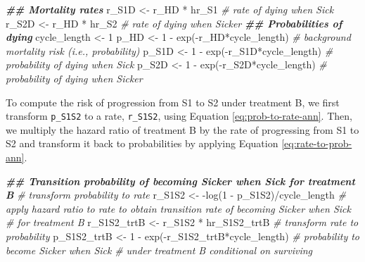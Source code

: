 \documentclass[
]{article}
\newenvironment{Shaded}{\begin{snugshade}}{\end{snugshade}}
\newcommand{\CommentTok}[1]{\textcolor[rgb]{0.56,0.35,0.01}{\textit{#1}}}
\newcommand{\DecValTok}[1]{\textcolor[rgb]{0.00,0.00,0.81}{#1}}
\newcommand{\DocumentationTok}[1]{\textcolor[rgb]{0.56,0.35,0.01}{\textbf{\textit{#1}}}}
\newcommand{\FunctionTok}[1]{\textcolor[rgb]{0.00,0.00,0.00}{#1}}
\newcommand{\NormalTok}[1]{#1}
\newcommand{\OtherTok}[1]{\textcolor[rgb]{0.56,0.35,0.01}{#1}}
\newcommand{\SpecialCharTok}[1]{\textcolor[rgb]{0.00,0.00,0.00}{#1}}
\begin{document}
\begin{Shaded}
\begin{Highlighting}[]
\DocumentationTok{\#\# Mortality rates}
\NormalTok{r\_S1D }\OtherTok{\textless{}{-}}\NormalTok{ r\_HD }\SpecialCharTok{*}\NormalTok{ hr\_S1 }\CommentTok{\# rate of dying when Sick}
\NormalTok{r\_S2D }\OtherTok{\textless{}{-}}\NormalTok{ r\_HD }\SpecialCharTok{*}\NormalTok{ hr\_S2 }\CommentTok{\# rate of dying when Sicker}
\DocumentationTok{\#\# Probabilities of dying}
\NormalTok{cycle\_length }\OtherTok{\textless{}{-}} \DecValTok{1}
\NormalTok{p\_HD  }\OtherTok{\textless{}{-}} \DecValTok{1} \SpecialCharTok{{-}} \FunctionTok{exp}\NormalTok{(}\SpecialCharTok{{-}}\NormalTok{r\_HD}\SpecialCharTok{*}\NormalTok{cycle\_length)  }\CommentTok{\# background mortality risk (i.e., probability)}
\NormalTok{p\_S1D }\OtherTok{\textless{}{-}} \DecValTok{1} \SpecialCharTok{{-}} \FunctionTok{exp}\NormalTok{(}\SpecialCharTok{{-}}\NormalTok{r\_S1D}\SpecialCharTok{*}\NormalTok{cycle\_length) }\CommentTok{\# probability of dying when Sick}
\NormalTok{p\_S2D }\OtherTok{\textless{}{-}} \DecValTok{1} \SpecialCharTok{{-}} \FunctionTok{exp}\NormalTok{(}\SpecialCharTok{{-}}\NormalTok{r\_S2D}\SpecialCharTok{*}\NormalTok{cycle\_length) }\CommentTok{\# probability of dying when Sicker}
\end{Highlighting}
\end{Shaded}

To compute the risk of progression from S1 to S2 under treatment B, we first transform \texttt{p\_S1S2} to a rate, \texttt{r\_S1S2}, using Equation \eqref{eq:prob-to-rate-ann}. Then, we multiply the hazard ratio of treatment B by the rate of progressing from S1 to S2 and transform it back to probabilities by applying Equation \eqref{eq:rate-to-prob-ann}.

\begin{Shaded}
\begin{Highlighting}[]
\DocumentationTok{\#\# Transition probability of becoming Sicker when Sick for treatment B}
\CommentTok{\# transform probability to rate}
\NormalTok{r\_S1S2 }\OtherTok{\textless{}{-}} \SpecialCharTok{{-}}\FunctionTok{log}\NormalTok{(}\DecValTok{1} \SpecialCharTok{{-}}\NormalTok{ p\_S1S2)}\SpecialCharTok{/}\NormalTok{cycle\_length}
\CommentTok{\# apply hazard ratio to rate to obtain transition rate of becoming Sicker when Sick }
\CommentTok{\# for treatment B}
\NormalTok{r\_S1S2\_trtB }\OtherTok{\textless{}{-}}\NormalTok{ r\_S1S2 }\SpecialCharTok{*}\NormalTok{ hr\_S1S2\_trtB}
\CommentTok{\# transform rate to probability}
\NormalTok{p\_S1S2\_trtB }\OtherTok{\textless{}{-}} \DecValTok{1} \SpecialCharTok{{-}} \FunctionTok{exp}\NormalTok{(}\SpecialCharTok{{-}}\NormalTok{r\_S1S2\_trtB}\SpecialCharTok{*}\NormalTok{cycle\_length) }\CommentTok{\# probability to become Sicker when Sick }
                                                  \CommentTok{\# under treatment B conditional on surviving}
\end{Highlighting}
\end{Shaded}
\end{document}
